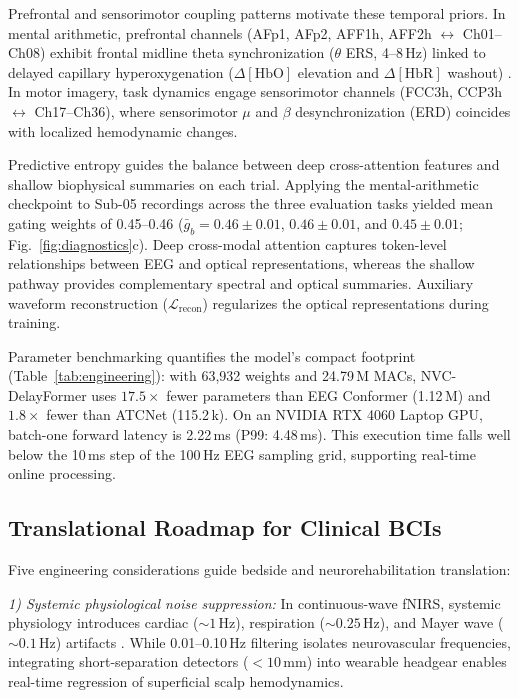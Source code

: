 \documentclass[journal]{IEEEtran}
\begin{document}
Prefrontal and sensorimotor coupling patterns motivate these temporal priors. In mental arithmetic, prefrontal channels (AFp1, AFp2, AFF1h, AFF2h $\leftrightarrow$ Ch01--Ch08) exhibit frontal midline theta synchronization ($\theta$ ERS, 4--8\,Hz) linked to delayed capillary hyperoxygenation ($\Delta[\mathrm{HbO}]$ elevation and $\Delta[\mathrm{HbR}]$ washout) \cite{attwell2010glial, iadecola2004neurovascular, gevins1997high}. In motor imagery, task dynamics engage sensorimotor channels (FCC3h, CCP3h $\leftrightarrow$ Ch17--Ch36), where sensorimotor $\mu$ and $\beta$ desynchronization (ERD) \cite{pfurtscheller1999event, mcfarland2000mu} coincides with localized hemodynamic changes.

Predictive entropy guides the balance between deep cross-attention features and shallow biophysical summaries on each trial. Applying the mental-arithmetic checkpoint to Sub-05 recordings across the three evaluation tasks yielded mean gating weights of 0.45--0.46 ($\bar{g}_b = 0.46 \pm 0.01$, $0.46 \pm 0.01$, and $0.45 \pm 0.01$; Fig.~\ref{fig:diagnostics}c). Deep cross-modal attention captures token-level relationships between EEG and optical representations, whereas the shallow pathway provides complementary spectral and optical summaries. Auxiliary waveform reconstruction ($\mathcal{L}_{\mathrm{recon}}$) regularizes the optical representations during training.

Parameter benchmarking quantifies the model's compact footprint (Table~\ref{tab:engineering}): with 63,932 weights and 24.79\,M MACs, NVC-DelayFormer uses $17.5\times$ fewer parameters than EEG Conformer (1.12\,M) and $1.8\times$ fewer than ATCNet (115.2\,k). On an NVIDIA RTX 4060 Laptop GPU, batch-one forward latency is 2.22\,ms (P99: 4.48\,ms). This execution time falls well below the 10\,ms step of the 100\,Hz EEG sampling grid, supporting real-time online processing.

\subsection{Translational Roadmap for Clinical BCIs}
Five engineering considerations guide bedside and neurorehabilitation translation:

\textit{1) Systemic physiological noise suppression:} In continuous-wave fNIRS, systemic physiology introduces cardiac ($\sim 1$\,Hz), respiration ($\sim 0.25$\,Hz), and Mayer wave ($\sim 0.1$\,Hz) artifacts \cite{scholkmann2014review}. While 0.01--0.10\,Hz filtering isolates neurovascular frequencies, integrating short-separation detectors ($<10$\,mm) into wearable headgear enables real-time regression of superficial scalp hemodynamics.
\end{document}
